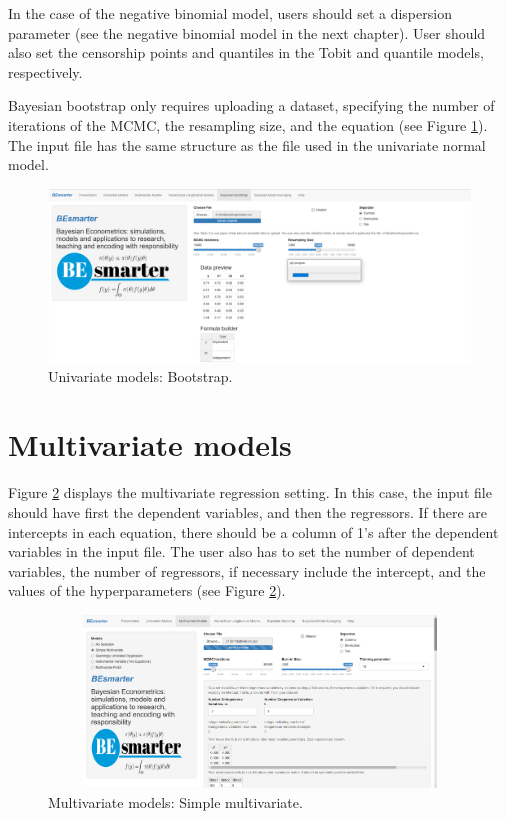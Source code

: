In the case of the negative binomial model, users should set a dispersion parameter (see the negative binomial model in the next chapter). User should also set the censorship points and quantiles in the Tobit and quantile models, respectively.

Bayesian bootstrap only requires uploading a dataset, specifying the number of iterations of the MCMC, the resampling size, and the equation (see Figure \ref{fig65}).
The input file has the same structure as the file used in the univariate normal model.

\begin{figure}
	\includegraphics[width=340pt, height=130pt]{Chapters/chapterGUI/figures/Figure5.png}
	\caption[List of figure caption goes here]{Univariate models: Bootstrap.}\label{fig65}
\end{figure}  

\section{Multivariate models}\label{secGUI3}

Figure \ref{fig66} displays the multivariate regression setting. In this case, the input file should have first the dependent variables, and then the regressors. If there are intercepts in each equation, there should be a column of 1's after the dependent variables in the input file. The user also has to set the number of dependent variables, the number of regressors, if necessary include the intercept, and the values of the hyperparameters (see Figure \ref{fig66}).

\begin{figure}
	\includegraphics[width=340pt, height=130pt]{Chapters/chapterGUI/figures/Figure6.png}
	\caption[List of figure caption goes here]{Multivariate models: Simple multivariate.}\label{fig66}
\end{figure}

